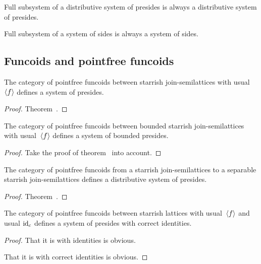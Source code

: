 \begin{obvious}
Full subsystem of a distributive system of presides is always a distributive system of presides.
\end{obvious}

\begin{obvious}
Full subsystem of a system of sides is always a system of sides.
\end{obvious}

\subsection{Funcoids and pointfree funcoids}

\begin{prop}
The category of pointfree funcoids between starrish join-semilattices with usual~$\left\langle f\right\rangle$ defines a system of presides.
\end{prop}

\begin{proof}
Theorem~.
\end{proof}

\begin{prop}
The category of pointfree funcoids between bounded starrish join-semilattices with usual~$\left\langle f\right\rangle$ defines a system of
bounded presides.
\end{prop}

\begin{proof}
Take the proof of theorem~ into account.
\end{proof}

\begin{prop}
The category of pointfree funcoids from a starrish join-semilattices to a separable starrish join-semilattices
defines a distributive system of presides.
\end{prop}

\begin{proof}
Theorem~.
\end{proof}

\begin{prop}
The category of pointfree funcoids between starrish lattices with usual~$\left\langle f\right\rangle$ and usual $\operatorname{id}_c$ defines a system of presides with correct identities.
\end{prop}

\begin{proof}
That it is with identities is obvious.

That it is with correct identities is obvious.
\end{proof}

